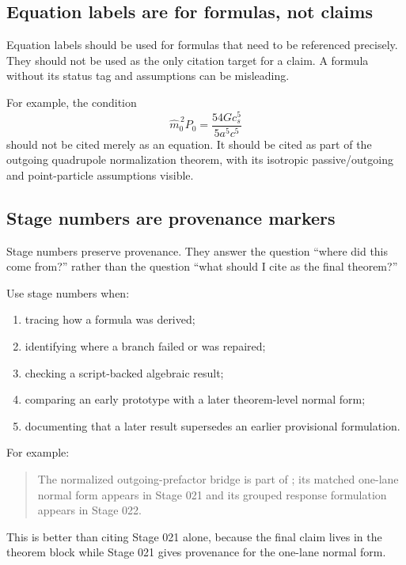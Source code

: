 \subsection{Equation labels are for formulas, not claims}
\label{subsec:equation-labels}

Equation labels should be used for formulas that need to be referenced precisely.  They should not be used as the only citation target for a claim.  A formula without its status tag and assumptions can be misleading.

For example, the condition
\[
\widehat m_0^{\,2}P_0
=
\frac{54G c_s^5}{5a^5c^5}
\]
should not be cited merely as an equation.  It should be cited as part of the outgoing quadrupole normalization theorem, with its isotropic passive/outgoing and point-particle assumptions visible.

\subsection{Stage numbers are provenance markers}
\label{subsec:stage-numbers-provenance}

Stage numbers preserve provenance.  They answer the question ``where did this come from?'' rather than the question ``what should I cite as the final theorem?''

Use stage numbers when:
\begin{enumerate}[leftmargin=2.2em]
  \item tracing how a formula was derived;
  \item identifying where a branch failed or was repaired;
  \item checking a script-backed algebraic result;
  \item comparing an early prototype with a later theorem-level normal form;
  \item documenting that a later result supersedes an earlier provisional formulation.
\end{enumerate}

For example:
\begin{quote}
The normalized outgoing-prefactor bridge is part of ; its matched one-lane normal form appears in Stage 021 and its grouped response formulation appears in Stage 022.
\end{quote}

This is better than citing Stage 021 alone, because the final claim lives in the theorem block while Stage 021 gives provenance for the one-lane normal form.

